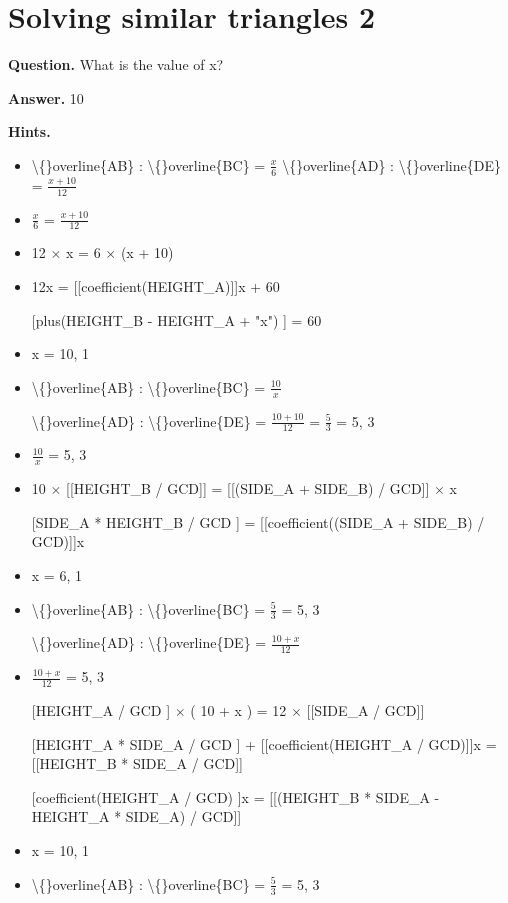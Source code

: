 \documentclass{article}
\begin{document}
\section*{Solving similar triangles 2}
\textbf{Question.} What is the value of x?

\textbf{Answer.} 10

\textbf{Hints.}
\begin{itemize}
  \item \textbackslash\{\}overline\{AB\} : \textbackslash\{\}overline\{BC\} = $\frac{x}{6}$
                        \textbackslash\{\}overline\{AD\} : \textbackslash\{\}overline\{DE\} = $\frac{x + 10}{12}$
  \item $\frac{x}{6}$ = $\frac{x + 10}{12}$
  \item 12 $\times$ x = 6 $\times$ (x + 10)
  \item 12x = [[coefficient(HEIGHT\_A)]]x + 60
  \item [[plus(HEIGHT\_B - HEIGHT\_A + "x")]] = 60
  \item x = 10, 1
  \item \textbackslash\{\}overline\{AB\} : \textbackslash\{\}overline\{BC\} = $\frac{10}{x}$
                        
                            \textbackslash\{\}overline\{AD\} : \textbackslash\{\}overline\{DE\} = $\frac{10 + 10}{12}$
                            = $\frac{5}{3}$
                            = 5, 3
  \item $\frac{10}{x}$ = 5, 3
  \item 10 $\times$ [[HEIGHT\_B / GCD]]
                        = [[(SIDE\_A + SIDE\_B) / GCD]] $\times$ x
  \item [[SIDE\_A * HEIGHT\_B / GCD]] = [[coefficient((SIDE\_A + SIDE\_B) / GCD)]]x
  \item x = 6, 1
  \item \textbackslash\{\}overline\{AB\} : \textbackslash\{\}overline\{BC\} = $\frac{5}{3}$
                            = 5, 3
                        
                        \textbackslash\{\}overline\{AD\} : \textbackslash\{\}overline\{DE\} = $\frac{10 + x}{12}$
  \item $\frac{10 + x}{12}$ = 5, 3
  \item [[HEIGHT\_A / GCD]] $\times$ (
                        10 + x
                        )
                        = 12 $\times$ [[SIDE\_A / GCD]]
  \item [[HEIGHT\_A * SIDE\_A / GCD]] + [[coefficient(HEIGHT\_A / GCD)]]x = [[HEIGHT\_B * SIDE\_A / GCD]]
  \item [[coefficient(HEIGHT\_A / GCD)]]x = [[(HEIGHT\_B * SIDE\_A - HEIGHT\_A * SIDE\_A) / GCD]]
  \item x = 10, 1
  \item \textbackslash\{\}overline\{AB\} : \textbackslash\{\}overline\{BC\} = $\frac{5}{3}$
                            = 5, 3
                        

\end{itemize}
\end{document}
